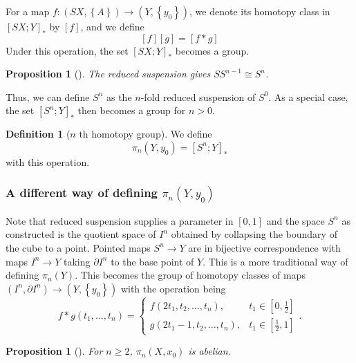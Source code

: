\documentclass[reqno]{amsart}
\newtheorem{proposition}[theorem]{Proposition}
\theoremstyle{definition}
\newtheorem{definition}[theorem]{Definition}
\theoremstyle{remark}
\begin{document}
  For a map $f \colon \left( SX, \left\{ A \right\}  \right) 
  \to \left( Y, \left\{ y_0 \right\}  \right) $, we denote its
  homotopy class in
  $\left[ SX; Y \right]_{*}$ by
  $\left[ f \right] $, and we define
  \[
  \left[ f \right] \left[ g \right] =
  \left[ f*g\right] 
  \] 
  Under this operation, the set
  $\left[ SX;Y \right]_*$ becomes a group.

  \begin{proposition}[]
      The reduced suspension gives
      $S S^{n-1}\cong S^{n}$.
  \end{proposition}

  Thus, we can define $S^{n}$ as the $n$-fold reduced
  suspension of $S^{0}$. As a special case,
  the set $\left[ S^{n};Y \right]_*$ then becomes
  a group for $n>0$. 

  \begin{definition}[$n$ th homotopy group]
      We define
      \[
      \pi_n \left( Y, y_0 \right) =
      \left[ S^{n}; Y \right]_*
      \] 
      with this operation.
  \end{definition}

  \subsubsection{A different way of defining
  $\pi_n \left( Y, y_0 \right) $}
  Note that reduced suspension supplies a parameter in
  $\left[ 0,1 \right] $ and the space
  $S^{n}$ as constructed is the quotient space of
  $I^{n}$ obtained by collapsing the boundary of the cube to a
  point.
  Pointed maps $S^{n}\to Y$ are in bijective correspondence
  with maps $I^{n}\to Y$ taking $\partial I^{n}$ to
  the base point of $Y$. This is a more traditional way
  of defining $\pi_n(Y)$. This becomes the group
  of homotopy classes of maps
  $\left( I^{n},\partial I^{n} \right) \to 
  \left( Y, \left\{ y_0 \right\}  \right) $ with the
  operation being
  \[
  f*g \left( t_1, \ldots, t_n \right) =
  \begin{cases}
      f\left( 2t_1, t_2, \ldots, t_n \right) ,& t_1 \in 
      \left[ 0,\frac{1}{2} \right] \\
      g\left( 2t_1-1, t_2, \ldots, t_n \right) ,& t_1 \in 
      \left[ \frac{1}{2},1 \right] 
  \end{cases}.
  \] 

  \begin{proposition}[]
      For $n\ge 2$, $\pi_n\left( X, x_0 \right)$ is abelian.
  \end{proposition}
\end{document}
